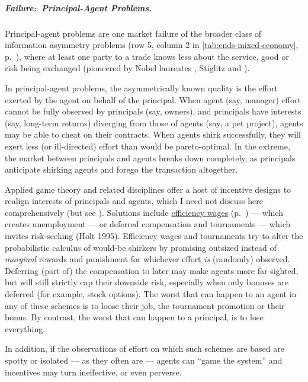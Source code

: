 \subparagraph[Failure:\ Principal-Agent Problems]{Failure:\ Principal-Agent Problems.}
	\label{sec:principal-agent-problem}
Principal-agent problems are one market failure of the broader class of information asymmetry problems (row 5, column 2 in \autoref{tab:ends-mixed-economy}, p.~\pageref{tab:ends-mixed-economy}), where at least one party to a trade knows less about the service, good or risk being exchanged (pioneered by Nobel laureates \citealt{Akerlof-1970-aa}, Stiglitz \citeyear{Stiglitz1976} and \citealt{Spence1974}).

In principal-agent problems, the asymmetrically known quality is the effort exerted by the agent on behalf of the principal.
When agent (say, manager) effort cannot be fully observed by principals (say, owners), and principals have interests (say, long-term returns) diverging from those of agents (say, a pet project), agents may be able to cheat on their contracts.
When agents shirk successfully, they will exert less (or ill-directed) effort than would be pareto-optimal.
In the extreme, the market between principals and agents breaks down completely, as principals anticipate shirking agents and forego the transaction altogether.

Applied game theory and related disciplines offer a host of incentive designs to realign interests of principals and agents, which I need not discuss here comprehensively (but see \citealt{Tirole2006}).
Solutions include \hyperref[sec:efficiency-wages]{efficiency wages} (p.~\pageref{sec:efficiency-wages}) --- which creates unemployment --- or deferred compensation and tournaments --- which invites risk-seeking (Holt 1995).
Efficiency wages and tournaments try to alter the probabilistic calculus of would-be shirkers by promising outsized instead of \emph{marginal} rewards and punishment for whichever effort \emph{is} (randomly) observed.
Deferring (part of) the compensation to later may make agents more far-sighted, but will still strictly cap their downside risk, especially when only bonuses are deferred (for example, stock options).
The worst that can happen to an agent in any of these schemes is to loose their job, the tournament promotion or their bonus.
By contrast, the worst that can happen to a principal, is to lose everything.

In addition, if the observations of effort on which such schemes are based are spotty or isolated --- as they often are --- agents can ``game the system'' and incentives may turn ineffective, or even perverse.

